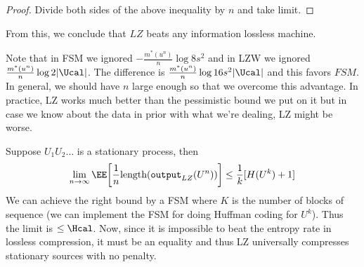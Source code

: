 \begin{proof}
Divide both sides of the above inequality by $n$ and take limit. 
\end{proof}
From this, we conclude that $LZ$ beats any information lossless machine. 
\begin{remark}
Note that in FSM we ignored $-\frac{m^*(u^n)}{n}\log 8s^2$ and in LZW we ignored $\frac{m^*(u^n)}{n}\log 2|\Ucal|$. The difference is $\frac{m^*(u^n)}{n}\log 16s^2|\Ucal|$ and this favors $FSM$. In general, we should have $n$ large enough so that we overcome this advantage. In practice, LZ works much better than the pessimistic bound we put on it but in case we know about the data in prior with what we're dealing, LZ might be worse.
\end{remark}
\begin{remark}
Suppose $U_1U_2\dots$ is a stationary process, then
    \[\lim_{n\to\infty}\EE\bigg[\frac{1}{n}\text{length}(\texttt{output}_{LZ}(U^n))\bigg] \leq \frac{1}{k}[H(U^k) + 1] \]
    We can achieve the right bound by a FSM where $K$ is the number of blocks of sequence (we can implement the FSM for doing Huffman coding for $U^k$). Thus the limit is $\leq \Hcal$. Now, since it is impossible to beat the entropy rate in lossless compression, it must be an equality and thus LZ universally compresses stationary sources with no penalty.
\end{remark}
